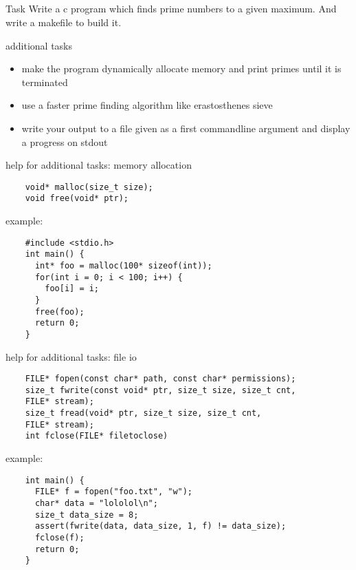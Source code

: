 \documentclass[10pt,graphics,aspectratio=169,table]{beamer}
\begin{document}
\subsection{}
\begin{frame}{Task}
  Write a c program which finds prime numbers to a given maximum.
  And write a makefile to build it.
\end{frame}
\begin{frame}{additional tasks}
  \begin{itemize}
  \item make the program dynamically allocate memory and print primes until
    it is terminated
  \item use a faster prime finding algorithm like erastosthenes sieve
  \item write your output to a file given as a first commandline
    argument and display a progress on stdout
  \end{itemize}
\end{frame}
\begin{frame}[fragile]{help for additional tasks: memory allocation}
  \begin{lstlisting}
    void* malloc(size_t size);
    void free(void* ptr);
  \end{lstlisting}
  example:
  \begin{lstlisting}
    #include <stdio.h>
    int main() {
      int* foo = malloc(100* sizeof(int));
      for(int i = 0; i < 100; i++) {
        foo[i] = i;
      }
      free(foo);
      return 0;
    }
  \end{lstlisting}
\end{frame}
\begin{frame}[fragile]{help for additional tasks: file io}
  \begin{lstlisting}
    FILE* fopen(const char* path, const char* permissions);
    size_t fwrite(const void* ptr, size_t size, size_t cnt, 
    FILE* stream);
    size_t fread(void* ptr, size_t size, size_t cnt, 
    FILE* stream);
    int fclose(FILE* filetoclose)
  \end{lstlisting}
  example:
  \begin{lstlisting}
    int main() {
      FILE* f = fopen("foo.txt", "w");
      char* data = "lololol\n";
      size_t data_size = 8;
      assert(fwrite(data, data_size, 1, f) != data_size);
      fclose(f);
      return 0;
    }
  \end{lstlisting}

\end{frame}
\end{document}
